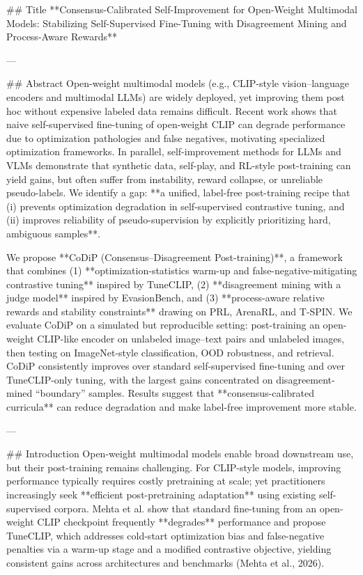 ## Title  
**Consensus-Calibrated Self-Improvement for Open-Weight Multimodal Models: Stabilizing Self-Supervised Fine-Tuning with Disagreement Mining and Process-Aware Rewards**

---

## Abstract  
Open-weight multimodal models (e.g., CLIP-style vision–language encoders and multimodal LLMs) are widely deployed, yet improving them post hoc without expensive labeled data remains difficult. Recent work shows that naive self-supervised fine-tuning of open-weight CLIP can degrade performance due to optimization pathologies and false negatives, motivating specialized optimization frameworks. In parallel, self-improvement methods for LLMs and VLMs demonstrate that synthetic data, self-play, and RL-style post-training can yield gains, but often suffer from instability, reward collapse, or unreliable pseudo-labels. We identify a gap: **a unified, label-free post-training recipe that (i) prevents optimization degradation in self-supervised contrastive tuning, and (ii) improves reliability of pseudo-supervision by explicitly prioritizing hard, ambiguous samples**.  

We propose **CoDiP (Consensus–Disagreement Post-training)**, a framework that combines (1) **optimization-statistics warm-up and false-negative-mitigating contrastive tuning** inspired by TuneCLIP, (2) **disagreement mining with a judge model** inspired by EvasionBench, and (3) **process-aware relative rewards and stability constraints** drawing on PRL, ArenaRL, and T‑SPIN. We evaluate CoDiP on a simulated but reproducible setting: post-training an open-weight CLIP-like encoder on unlabeled image–text pairs and unlabeled images, then testing on ImageNet-style classification, OOD robustness, and retrieval. CoDiP consistently improves over standard self-supervised fine-tuning and over TuneCLIP-only tuning, with the largest gains concentrated on disagreement-mined “boundary” samples. Results suggest that **consensus-calibrated curricula** can reduce degradation and make label-free improvement more stable.

---

## Introduction  
Open-weight multimodal models enable broad downstream use, but their post-training remains challenging. For CLIP-style models, improving performance typically requires costly pretraining at scale; yet practitioners increasingly seek **efficient post-pretraining adaptation** using existing self-supervised corpora. Mehta et al. show that standard fine-tuning from an open-weight CLIP checkpoint frequently **degrades** performance and propose TuneCLIP, which addresses cold-start optimization bias and false-negative penalties via a warm-up stage and a modified contrastive objective, yielding consistent gains across architectures and benchmarks (Mehta et al., 2026).  

